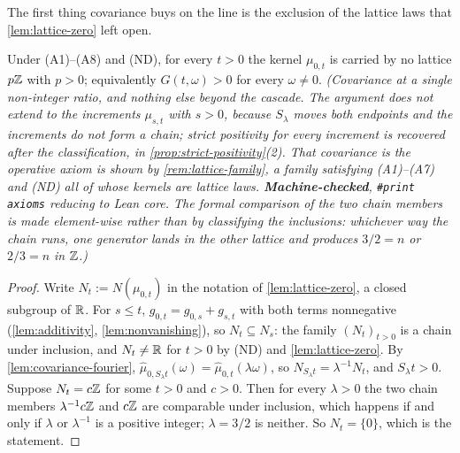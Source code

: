 The first thing covariance buys on the line is the exclusion of the lattice laws that
\ref{lem:lattice-zero} left open.

\begin{lemma}\label{lem:no-lattice}
\leanok
Under (A1)--(A8) and (ND), for every $t > 0$ the kernel $\mu_{0,t}$ is carried by no lattice
$p\mathbb{Z}$ with $p > 0$; equivalently $G(t,\omega) > 0$ for every $\omega \ne 0$.
\statusT\quad\emph{(Covariance at a single non-integer ratio, and nothing else beyond the
cascade. The argument does not extend to the increments $\mu_{s,t}$ with $s > 0$, because
$S_\lambda$ moves both endpoints and the increments do not form a chain; strict positivity for
every increment is recovered after the classification, in
\ref{prop:strict-positivity}(2). That covariance is the operative axiom is shown by
\ref{rem:lattice-family}, a family satisfying (A1)--(A7) and (ND) all of whose kernels are
lattice laws. \textbf{Machine-checked}, \texttt{\#print axioms} reducing to Lean core. The
formal comparison of the two chain members is made element-wise rather than by classifying the
inclusions: whichever way the chain runs, one generator lands in the other lattice and produces
$3/2 = n$ or $2/3 = n$ in $\mathbb{Z}$.)}
\end{lemma}

\begin{proof}
\leanok
Write $N_t := N(\mu_{0,t})$ in the notation of \ref{lem:lattice-zero}, a closed subgroup of
$\mathbb{R}$. For $s \le t$, $g_{0,t} = g_{0,s} + g_{s,t}$ with both terms nonnegative
(\ref{lem:additivity}, \ref{lem:nonvanishing}), so $N_t \subseteq N_s$: the family
$(N_t)_{t>0}$ is a chain under inclusion, and $N_t \ne \mathbb{R}$ for $t > 0$ by (ND) and
\ref{lem:lattice-zero}. By \ref{lem:covariance-fourier},
$\hat\mu_{0,S_\lambda t}(\omega) = \hat\mu_{0,t}(\lambda\omega)$, so
$N_{S_\lambda t} = \lambda^{-1}N_t$, and $S_\lambda t > 0$. Suppose $N_t = c\mathbb{Z}$ for some
$t > 0$ and $c > 0$. Then for every $\lambda > 0$ the two chain members $\lambda^{-1}c\mathbb{Z}$ and
$c\mathbb{Z}$ are comparable under inclusion, which happens if and only if $\lambda$ or
$\lambda^{-1}$ is a positive integer; $\lambda = 3/2$ is neither. So $N_t = \{0\}$, which is
the statement.
\end{proof}

